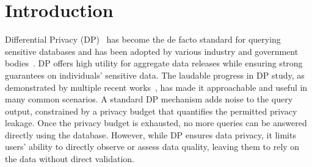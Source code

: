 \section{Introduction}\label{sec:intro}

Differential Privacy (DP)~\cite{dwork2006calibrating} has become the de facto standard for querying sensitive databases and has been adopted by various industry and government bodies~\cite{abowd2018us,erlingsson2014rappor,ding2017collecting}. 
DP offers high utility for aggregate data releases while ensuring strong guarantees on individuals' sensitive data. 
The laudable progress in DP study, as demonstrated by multiple recent works~\cite{zhang2015private,zhang2017privbayes,kotsogiannis2019privatesql,abs-1802-06739,gupta2010differentially,ZhangXX16}, has made it approachable and useful in many common scenarios. 
A standard DP mechanism adds noise to the query output, constrained by a privacy budget that quantifies the permitted privacy leakage. Once the privacy budget is exhausted, no more queries can be answered directly using the database. 
However, while DP ensures data privacy, it limits users' ability to directly observe or assess data quality, leaving them to rely on the data without direct validation. 

